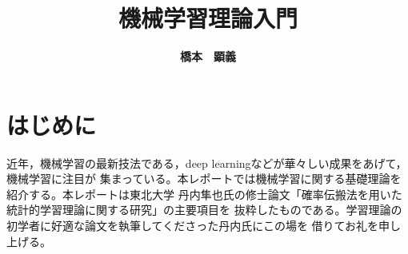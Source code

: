 \documentclass[12pt]{jreport}
\title{\bf{機械学習理論入門}}
\date{\hfill}
\author{\bf{橋本　顕義}}
\theoremstyle{break}
\begin{document}
\maketitle
\tableofcontents

\chapter*{はじめに}
近年，機械学習の最新技法である，deep learningなどが華々しい成果をあげて，機械学習に注目が
集まっている。本レポートでは機械学習に関する基礎理論を紹介する。本レポートは東北大学
丹内隼也氏の修士論文「確率伝搬法を用いた統計的学習理論に関する研究」の主要項目を
抜粋したものである。学習理論の初学者に好適な論文を執筆してくださった丹内氏にこの場を
借りてお礼を申し上げる。



\end{document}
